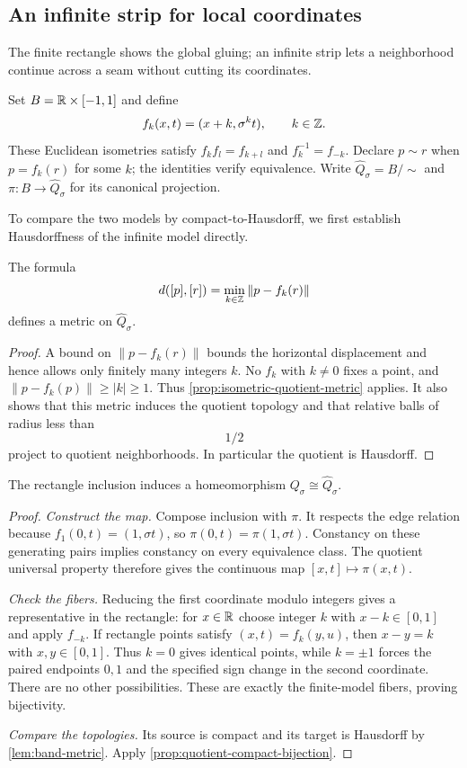 \subsection{An infinite strip for local coordinates}
The finite rectangle shows the global gluing; an infinite strip lets a
neighborhood continue across a seam without cutting its coordinates.
\begin{construction}
Set $B=\mathbb{R}\times[-1,1]$ and define
\[
f_k(x,t)=(x+k,\sigma^k t),\qquad k\in\mathbb{Z}.
\]
These Euclidean isometries satisfy $f_kf_l=f_{k+l}$ and
$f_k^{-1}=f_{-k}$. Declare $p\sim r$ when $p=f_k(r)$ for some $k$;
the identities verify equivalence. Write $\widehat Q_\sigma=B/{\sim}$
and $\pi:B\to\widehat Q_\sigma$ for its canonical projection.
\end{construction}
To compare the two models by compact-to-Hausdorff, we first establish
Hausdorffness of the infinite model directly.
\begin{lemma}\label{lem:band-metric}
The formula
\[
d([p],[r])=\min_{k\in\mathbb{Z}}\|p-f_k(r)\|
\]
defines a metric on $\widehat Q_\sigma$.
\end{lemma}
\begin{proof}
A bound on $\|p-f_k(r)\|$ bounds the horizontal displacement and hence
allows only finitely many integers $k$. No $f_k$ with $k\ne0$ fixes a
point, and $\|p-f_k(p)\|\geq |k|\geq1$. Thus
\cref{prop:isometric-quotient-metric} applies. It also shows that this
metric induces the quotient topology and that relative balls of radius
less than
\[
1/2
\]
 project to quotient neighborhoods. In particular the
quotient is Hausdorff.
\end{proof}
\begin{proposition}
The rectangle inclusion induces a homeomorphism
$Q_\sigma\cong\widehat Q_\sigma$.
\end{proposition}
\begin{proof}
\emph{Construct the map.} Compose inclusion with $\pi$. It respects the
edge relation because $f_1(0,t)=(1,\sigma t)$, so
$\pi(0,t)=\pi(1,\sigma t)$. Constancy on these generating pairs implies
constancy on every equivalence class. The quotient universal property
therefore gives the continuous map $[x,t]\mapsto\pi(x,t)$.

\emph{Check the fibers.} Reducing the first coordinate modulo integers gives
a representative in the rectangle: for $x\in\mathbb{R}$ choose integer $k$
with $x-k\in[0,1]$ and apply $f_{-k}$. If rectangle points satisfy
$(x,t)=f_k(y,u)$, then $x-y=k$ with $x,y\in[0,1]$. Thus $k=0$ gives
identical points, while $k=\pm1$ forces the paired endpoints $0,1$ and
the specified sign change in the second coordinate. There are no other
possibilities. These are exactly the finite-model fibers, proving bijectivity.

\emph{Compare the topologies.} Its source is compact and its target is
Hausdorff by \cref{lem:band-metric}. Apply
\cref{prop:quotient-compact-bijection}.
\end{proof}

